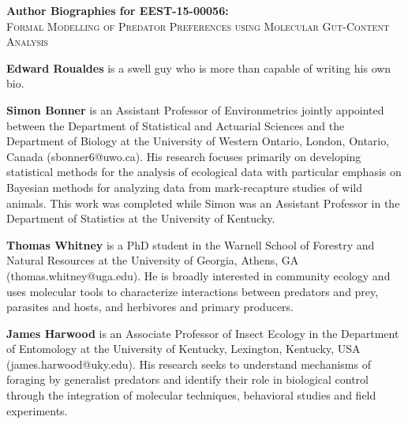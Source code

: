\documentclass[12pt]{article}
\begin{document}
\begin{center}
  \begin{Large}
    \textbf{Author Biographies for EEST-15-00056:}\\
    \textsc{Formal Modelling of Predator Preferences using Molecular Gut-Content
      Analysis}
  \end{Large}
\end{center}

\textbf{Edward Roualdes} is a swell guy who is more than capable of writing his own bio. 

\textbf{Simon Bonner} is an Assistant Professor of Environmetrics jointly appointed between the Department of Statistical and Actuarial Sciences and the Department of Biology at the University of Western Ontario, London, Ontario, Canada (sbonner6@uwo.ca). His research focuses primarily on developing statistical methods for the analysis of ecological data with particular emphasis on Bayesian methods for analyzing data from mark-recapture studies of wild animals. This work was completed while Simon was an Assistant Professor in the Department of Statistics at the University of Kentucky.

\textbf{Thomas Whitney} is a PhD student in the Warnell School of Forestry and Natural Resources at the University of Georgia, Athens, GA (thomas.whitney@uga.edu).  He is broadly interested in community ecology and uses molecular tools to characterize interactions between predators and prey, parasites and hosts, and herbivores and primary producers.

\textbf{James Harwood} is an Associate Professor of Insect Ecology in the Department of Entomology at the University of Kentucky, Lexington, Kentucky, USA (james.harwood@uky.edu). His research seeks to understand mechanisms of foraging by generalist predators and identify their role in biological control through the integration of molecular techniques, behavioral studies and field experiments.
\end{document}

